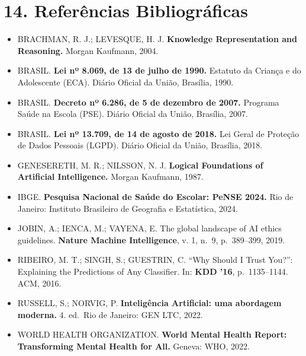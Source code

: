 \documentclass[11pt]{article}
\begin{document}
    \section{14. Referências
Bibliográficas}\label{referuxeancias-bibliogruxe1ficas}

\begin{itemize}
\item
  BRACHMAN, R. J.; LEVESQUE, H. J. \textbf{Knowledge Representation and
  Reasoning.} Morgan Kaufmann, 2004.
\item
  BRASIL. \textbf{Lei nº 8.069, de 13 de julho de 1990.} Estatuto da
  Criança e do Adolescente (ECA). Diário Oficial da União, Brasília,
  1990.
\item
  BRASIL. \textbf{Decreto nº 6.286, de 5 de dezembro de 2007.} Programa
  Saúde na Escola (PSE). Diário Oficial da União, Brasília, 2007.
\item
  BRASIL. \textbf{Lei nº 13.709, de 14 de agosto de 2018.} Lei Geral de
  Proteção de Dados Pessoais (LGPD). Diário Oficial da União, Brasília,
  2018.
\item
  GENESERETH, M. R.; NILSSON, N. J. \textbf{Logical Foundations of
  Artificial Intelligence.} Morgan Kaufmann, 1987.
\item
  IBGE. \textbf{Pesquisa Nacional de Saúde do Escolar: PeNSE 2024.} Rio
  de Janeiro: Instituto Brasileiro de Geografia e Estatística, 2024.
\item
  JOBIN, A.; IENCA, M.; VAYENA, E. The global landscape of AI ethics
  guidelines. \textbf{Nature Machine Intelligence}, v. 1, n.~9,
  p.~389--399, 2019.
\item
  RIBEIRO, M. T.; SINGH, S.; GUESTRIN, C. ``Why Should I Trust You?'':
  Explaining the Predictions of Any Classifier. In: \textbf{KDD '16},
  p.~1135--1144. ACM, 2016.
\item
  RUSSELL, S.; NORVIG, P. \textbf{Inteligência Artificial: uma abordagem
  moderna.} 4. ed.~Rio de Janeiro: GEN LTC, 2022.
\item
  WORLD HEALTH ORGANIZATION. \textbf{World Mental Health Report:
  Transforming Mental Health for All.} Geneva: WHO, 2022.
\end{itemize}


    
    
    


\end{document}

